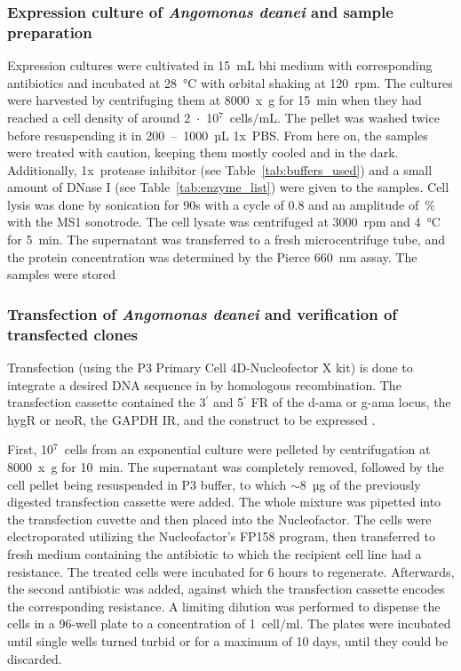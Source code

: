 \subsubsection{Expression culture of \textit{Angomonas deanei} and sample preparation} \label{txt:express_ango} 
Expression cultures were cultivated in 15~mL \Gls{bhi} medium with corresponding antibiotics and incubated at 28~°C with orbital shaking at 120~rpm. The cultures were harvested by centrifuging them at 8000~x~g for 15~min when they had reached a cell density of around 2~$\cdot$~10$^7$~cells/mL. The pellet was washed twice before resuspending it in 200~--~1000~µL 1x~\gls{PBS}. From here on, the samples were treated with caution, keeping them mostly cooled and in the dark. Additionally, 1x~protease inhibitor (see Table~\ref{tab:buffers_used}) and a small amount of DNase I (see Table~\ref{tab:enzyme_list}) were given to the samples. Cell lysis was done by sonication for 90s with a cycle of 0.8 and an amplitude of~\% with the MS1 sonotrode. The cell lysate was centrifuged at 3000~rpm and 4~°C for 5~min. The supernatant was transferred to a fresh microcentrifuge tube, and the protein concentration was determined by the Pierce 660~nm assay. The samples were stored 
\subsubsection{Transfection of \textit{Angomonas deanei} and verification of transfected clones} \label{txt:Transfection}
Transfection (using the P3 Primary Cell 4D-Nucleofector X kit) is done to integrate a desired DNA sequence in  by homologous recombination. The transfection cassette contained the 3$^\prime$ and 5$^\prime$ \gls{FR} of the \gls{d-ama} or \gls{g-ama} locus, the \gls{hygR} or \gls{neoR}, the \gls{GAPDH IR}, and the construct to be expressed \parencite{morales_development_2016}. 

\par First, 10$^7$~cells from an exponential culture were pelleted by centrifugation at 8000~x~g for 10~min. The supernatant was completely removed, followed by the cell pellet being resuspended in P3 buffer, to which $\sim$8~µg of the previously digested transfection cassette were added. The whole mixture was pipetted into the transfection cuvette and then placed into the Nucleofactor. The cells were electroporated utilizing the Nucleofactor's FP158 program, then transferred to fresh medium containing the antibiotic to which the recipient cell line had a resistance. The treated cells were incubated for 6 hours to regenerate. Afterwards, the second antibiotic was added, against which the transfection cassette encodes the corresponding resistance. A limiting dilution was performed to dispense the cells in a 96-well plate to a concentration of 1~cell/ml. The plates were incubated until single wells turned turbid or for a maximum of 10 days, until they could be discarded.    

